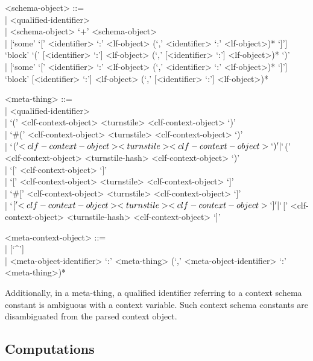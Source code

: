 \documentclass[11pt]{article}
\begin{document}
\begin{grammar}
<schema-object> ::= \hfill\\
| <qualified-identifier>\\
| <schema-object> `+' <schema-object>\\
| [`some' `[' <identifier> `:' <lf-object> (`,' <identifier> `:' <lf-object>)* `]']\\
`block' `(' [<identifier> `:'] <lf-object> (`,' [<identifier> `:'] <lf-object>)* `)'\\
| [`some' `[' <identifier> `:' <lf-object> (`,' <identifier> `:' <lf-object>)* `]']\\
`block' [<identifier> `:'] <lf-object> (`,' [<identifier> `:'] <lf-object>)*

<meta-thing> ::= \hfill\\
| <qualified-identifier>\\
| `(' <clf-context-object> <turnstile> <clf-context-object> `)'\\
| `#(' <clf-context-object> <turnstile> <clf-context-object> `)'\\
| `$(' <clf-context-object> <turnstile> <clf-context-object> `)'\\
| `$(' <clf-context-object> <turnstile-hash> <clf-context-object> `)'\\
| `[' <clf-context-object> `]'\\
| `[' <clf-context-object> <turnstile> <clf-context-object> `]'\\
| `#[' <clf-context-object> <turnstile> <clf-context-object> `]'\\
| `$[' <clf-context-object> <turnstile> <clf-context-object> `]'\\
| `$[' <clf-context-object> <turnstile-hash> <clf-context-object> `]'

<meta-context-object> ::= \hfill\\
| [`^']\\
| <meta-object-identifier> `:' <meta-thing> (`,' <meta-object-identifier> `:' <meta-thing>)*
\end{grammar}

Additionally, in a meta-thing, a qualified identifier referring to a context schema constant is ambiguous with a context variable.
Such context schema constants are disambiguated from the parsed context object.

\subsection{Computations}
\end{document}
